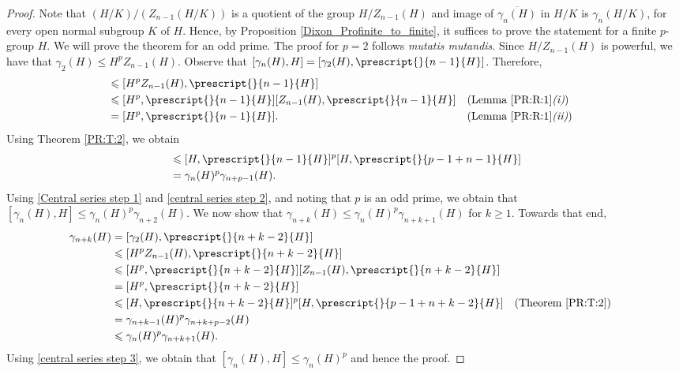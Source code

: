 \documentclass[12pt]{elsarticle}
\newtheorem*{main corollary*}{Main Corollary}
\theoremstyle{definition}
\begin{document}
\begin{proof}
    Note that $(H/K)/(Z_{n-1}(H/K))$ is a quotient of the group $H/Z_{n-1}(H)$ and image of $\overline{\gamma_n(H)}$ in $H/K$ is $\gamma_n(H/K)$, for every open normal subgroup $K$ of $H$. Hence, by Proposition \ref{Dixon_Profinite_to_finite}, it suffices to prove the statement for a finite $p$-group $H$. We will prove the theorem for an odd prime. The proof for $p=2$ follows \textit{mutatis mutandis}. Since $H/Z_{n-1}(H)$ is powerful, we have that $\gamma_2(H) \leqslant H^p Z_{n-1}(H)$. Observe that $[\gamma_n(H),H]=[\gamma_2(H), \prescript{}{n-1}{H}]$. Therefore,
    \begin{align}
        [\gamma_n(H),H] &\leqslant [H^p Z_{n-1}(H), \prescript{}{n-1}{H}]\nonumber\\
        & \leqslant [H^p, \prescript{}{n-1}{H}][ Z_{n-1}(H), \prescript{}{n-1}{H}]&&\mbox{(Lemma \ref{PR:R:1}\textit{(i)})}\nonumber\\
        &=[H^p, \prescript{}{n-1}{H}]. &&\mbox{(Lemma \ref{PR:R:1}\textit{(ii)})}\label{Central series step 1}
    \end{align}Using Theorem \ref{PR:T:2}, we obtain
    \begin{align}
        [H^p, \prescript{}{n-1}{H}]&\leqslant[H, \prescript{}{n-1}{H}]^p[H, \prescript{}{p-1+n-1}{H}]\nonumber\\
        &=\gamma_n(H)^p\gamma_{n+p-1}(H).\label{central series step 2}
    \end{align} Using \eqref{Central series step 1} and \eqref{central series step 2}, and noting that $p$ is an odd prime, we obtain that {$[\gamma_n(H),H] \leqslant \gamma_n(H)^p\gamma_{n+2}(H)$}. We now show that $\gamma_{n+k}(H) \leqslant \gamma_n(H)^p\gamma_{n+k+1}(H)$ for $k \geq 1$. Towards that end,
    \begin{align}
		\gamma_{n+k}(H)&=[\gamma_2(H), \prescript{}{n+k-2}{H}] \nonumber\\
		&\leqslant [H^pZ_{n-1}(H), \prescript{}{n+k-2}{H}] \nonumber\\
            &\leqslant [H^p, \prescript{}{n+k-2}{H}][Z_{n-1}(H), \prescript{}{n+k-2}{H}]\nonumber\\
            &= [H^p, \prescript{}{n+k-2}{H}]\nonumber\\
            &\leqslant [H, \prescript{}{n+k-2}{H}]^p[H, \prescript{}{p-1+n+k-2}{H}] && \mbox{(Theorem } \ref{PR:T:2})\nonumber\\
            &= \gamma_{n+k-1}(H)^p\gamma_{n+k+p-2}(H)\nonumber\\
            &\leqslant \gamma_n(H)^p\gamma_{n+k+1}(H).\label{central series step 3}
    \end{align}
    Using \eqref{central series step 3}, we obtain that $[\gamma_n(H),H] \leqslant \gamma_n(H)^p$ and hence the proof.
\end{proof}
\end{document}

